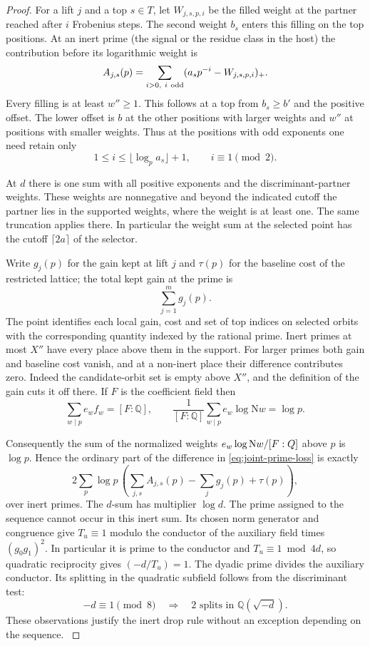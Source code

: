 \begin{proof}
For a lift \(j\) and a top \(s\in T\), let \(W_{j,s,p,i}\) be the
filled weight at the partner reached after \(i\) Frobenius steps.
The second weight \(b_s\) enters this filling on the top positions.
At an inert prime (the signal or the residue class in the host)
the contribution before its logarithmic weight is
\[
 A_{j,s}(p)=\sum_{i>0,\ i\ {\rm odd}}
                 (a_s p^{-i}-W_{j,s,p,i})_+ .
\]
Every filling is at least \(w''\ge1\). This follows at a top from
\(b_s\ge b'\) and the positive offset. The lower offset is \(b\)
at the other positions with larger weights and \(w''\) at positions
with smaller weights. Thus at the positions with odd exponents one need retain only
\[
 1\le i\le\lfloor\log_p a_s\rfloor+1,\qquad i\equiv1\pmod 2 .
\]

At \(d\) there is one sum with all
positive exponents and the discriminant-partner weights. These
weights are nonnegative and beyond the indicated cutoff the partner lies in
the supported weights, where the weight is at least one.
The same truncation applies there. In particular the weight sum at the selected point has the cutoff \(\lceil2a\rceil\) of the selector.

Write \(g_j(p)\) for the gain kept at lift \(j\) and \(\tau(p)\) for the baseline cost of the restricted lattice; the total kept gain at the prime is
\[
 \sum_{j=1}^m g_j(p).
\] The point identifies
each local gain, cost and set of top indices on selected orbits with the corresponding quantity indexed by the rational prime. Inert primes at most \(X''\) have every place above them in
the support. For larger primes both gain and baseline cost vanish,
and at a non-inert place their difference contributes zero.
Indeed the candidate-orbit set is empty above \(X''\), and the
definition of the gain cuts it off there. If \(F\) is the
coefficient field then 
\[
 \sum_{w\mid p}e_w f_w=[F:\mathbb Q],\qquad \frac1{[F:\mathbb Q]}\sum_{w\mid p}e_w\log\mathrm Nw=\log p.
\]

Consequently the sum of the normalized weights
\(e_w\log{\rm N}w/[F:\mathbb Q]\) above \(p\) is \(\log p\).
Hence the ordinary part of the difference in
\eqref{eq:joint-prime-loss} is exactly
\begin{equation}\label{eq:loss-deficit-per-prime}
 2\sum_p \log p\,
 \left(\sum_{j,s} A_{j,s}(p)-\sum_j g_j(p)+\tau(p)\right),
\end{equation}
over inert primes. The \(d\)-sum has multiplier \(\log d\).
The prime assigned to the sequence cannot occur in this inert sum. Its chosen norm
generator and congruence give \(T_u\equiv1\) modulo the conductor of the auxiliary field times \((g_0g_1)^2\). In particular it is prime to
the conductor and \(T_u\equiv1\bmod 4d\), so quadratic reciprocity
gives \(({-d}/T_u)=1\). The dyadic prime divides the auxiliary conductor. Its splitting in the quadratic subfield follows from the discriminant test:
\[
 -d\equiv1\pmod 8\quad\Longrightarrow\quad 2\text{ splits in }\mathbb Q(\sqrt{-d}).
\] These observations
justify the inert drop rule without an exception depending on the sequence.
\label{cor:prime-class-loss-1}


\end{proof}
